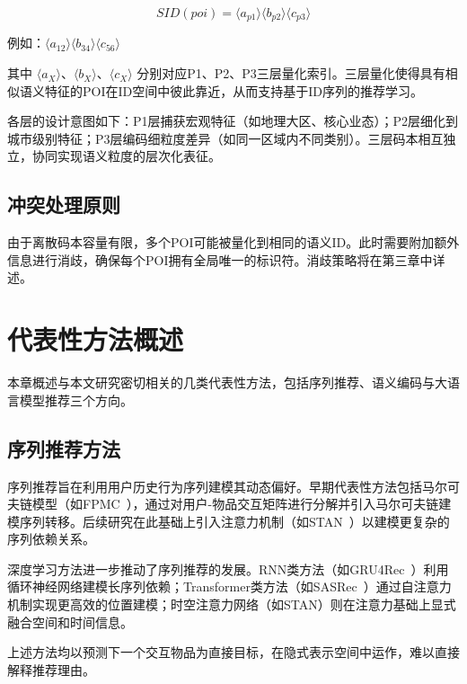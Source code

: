 \begin{equation}
SID(poi) = \langle a_{p1} \rangle \langle b_{p2} \rangle \langle c_{p3} \rangle
\label{eq:sid_format}
\end{equation}

例如：$\langle a_{12} \rangle \langle b_{34} \rangle \langle c_{56} \rangle$

其中 $\langle a_X \rangle$、$\langle b_X \rangle$、$\langle c_X \rangle$ 分别对应P1、P2、P3三层量化索引。三层量化使得具有相似语义特征的POI在ID空间中彼此靠近，从而支持基于ID序列的推荐学习。

各层的设计意图如下：P1层捕获宏观特征（如地理大区、核心业态）；P2层细化到城市级别特征；P3层编码细粒度差异（如同一区域内不同类别）。三层码本相互独立，协同实现语义粒度的层次化表征。

\subsection{冲突处理原则}
\label{sec:collision_principle}

由于离散码本容量有限，多个POI可能被量化到相同的语义ID。此时需要附加额外信息进行消歧，确保每个POI拥有全局唯一的标识符。消歧策略将在第三章中详述。

\section{代表性方法概述}
\label{sec:related_methods}

本章概述与本文研究密切相关的几类代表性方法，包括序列推荐、语义编码与大语言模型推荐三个方向。

\subsection{序列推荐方法}
\label{sec:sequential_rec}

序列推荐旨在利用用户历史行为序列建模其动态偏好。早期代表性方法包括马尔可夫链模型（如FPMC~\cite{rendle2010factorifying}），通过对用户-物品交互矩阵进行分解并引入马尔可夫链建模序列转移。后续研究在此基础上引入注意力机制（如STAN~\cite{wang2021spatial}）以建模更复杂的序列依赖关系。

深度学习方法进一步推动了序列推荐的发展。RNN类方法（如GRU4Rec~\cite{hidasi2015session}）利用循环神经网络建模长序列依赖；Transformer类方法（如SASRec~\cite{kang2018self}）通过自注意力机制实现更高效的位置建模；时空注意力网络（如STAN）则在注意力基础上显式融合空间和时间信息。

上述方法均以预测下一个交互物品为直接目标，在隐式表示空间中运作，难以直接解释推荐理由。

